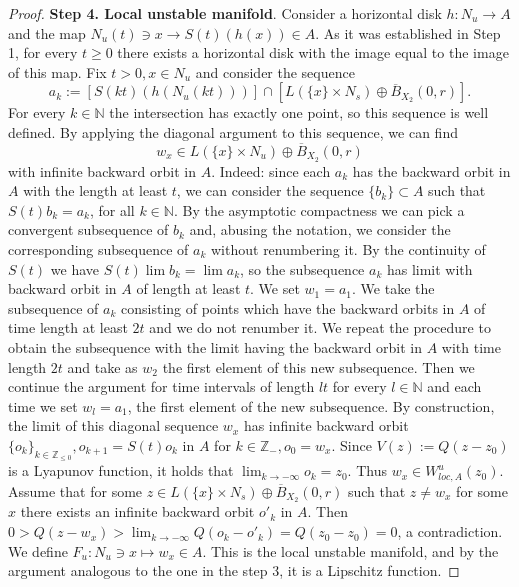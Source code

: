 \documentclass[11pt, leqno]{amsart}
\theoremstyle{definition}
\begin{document}
\begin{proof}
	\textbf{Step 4. Local unstable manifold}. Consider a horizontal disk $h:N_u \to A$ and the map $N_u(t)\ni x \to S(t)(h(x))\in A$. As it was established in Step 1, for every $t \geq 0$ there exists a horizontal disk with the image equal to the image of this map. Fix $t > 0, x \in  N_u$ and consider the sequence
	$$a_k := \left[S(kt)(h(N_u(kt)))\right] \cap \left[L \left( \{x\} \times N_s\right) \oplus \overline{B}_{X_2}(0,r)\right].$$ For every $k \in \mathbb{N}$ the intersection has exactly one point, so this sequence is well defined. By applying the diagonal argument to this sequence, we can find
	$$w_x \in L \left( \{x\} \times N_u\right) \oplus \overline{B}_{X_2}(0,r)$$ with infinite backward orbit in $A$. Indeed: since each $a_k$ has the backward orbit in $A$ with the length at least $t$, we can consider the sequence $\{b_k\}\subset A$ such that $S(t)b_k = a_k$, for all $k \in \mathbb{N}$. By the asymptotic compactness we can  pick a convergent subsequence of $b_k$ and, abusing the notation, we consider the  corresponding subsequence of $a_k$ without renumbering it. By the continuity of $S(t)$ we have $S(t) \lim b_k = \lim a_k$, so the subsequence $a_k$ has limit with backward orbit in $A$ of length at least $t$. We set $w_1 = a_1$. We take the subsequence of ${a_k}$ consisting of points which have the backward orbits in $A$ of time length at least $2t$ and we do not renumber it. We repeat the procedure to obtain the subsequence with the limit having the backward orbit in $A$ with time length $2t$ and take as $w_2$ the first element of this new subsequence. Then we continue the argument for time intervals of length $lt$ for every $l \in \mathbb{N}$ and each time we set $w_l = a_1$, the first element of the new subsequence. By construction, the limit of this diagonal sequence $w_x$ has infinite backward orbit $\{o_k\}_{k \in \mathbb{Z}_{\leq 0}}, o_{k+1} = S(t)o_k$ in $A$ for $k \in \mathbb{Z_-}, o_0 = w_x$. Since $V(z) := Q(z - z_0)$ is a Lyapunov function, it holds that $\lim_{k \to -\infty} o_k = z_0$. Thus $w_x \in W^u_{loc,A}(z_0)$. Assume that for some $z  \in L \left( \{x\} \times N_s\right) \oplus \overline{B}_{X_2}(0,r)$ such that $z\neq w_x$ for some $x$ there exists an infinite backward orbit $o'_k$ in $A$. Then
	$0 > Q(z - w_x) > \lim_{k\to -\infty} Q(o_k - o'_k) = Q(z_0 - z_0) = 0$, a contradiction.
	We define $F_u: N_u \ni x \mapsto w_x \in A$. This is the local unstable manifold, and by the argument analogous to the one in the step 3, it is a Lipschitz function.
\end{proof}
\end{document}
